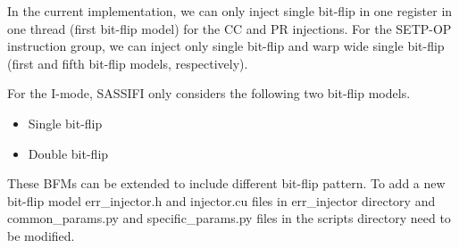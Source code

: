 In the current implementation, we can only inject single bit-flip in one
register in one thread (first bit-flip model) for the CC and PR injections. For
the SETP-OP instruction group, we can inject only single bit-flip and warp
wide single bit-flip (first and fifth bit-flip models, respectively).

For the I-mode, SASSIFI only considers the following two bit-flip models.  
\begin{itemize}
\item Single bit-flip 
\item Double bit-flip 
\end{itemize}

These BFMs can be extended to include different bit-flip pattern. To add a new
bit-flip model err\_injector.h and injector.cu files in err\_injector directory
and common\_params.py and specific\_params.py files in the scripts directory
need to be modified. 

